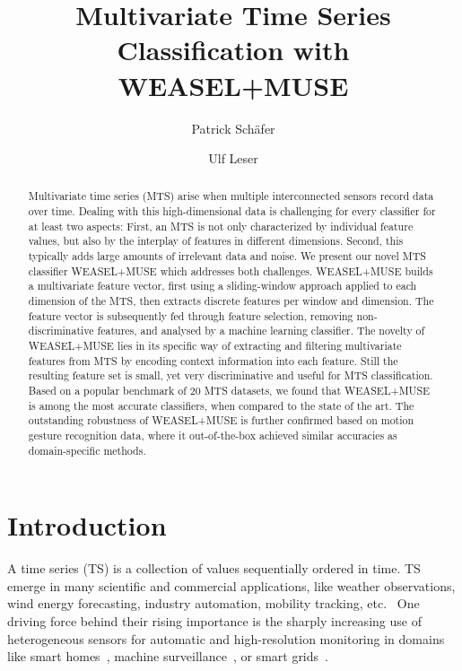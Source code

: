 \documentclass[sigconf]{acmart}
\begin{document}
\title{Multivariate Time Series Classification with WEASEL+MUSE}

\author{Patrick Sch\"afer}

\author{Ulf Leser}

\begin{abstract}
Multivariate time series (MTS) arise when multiple interconnected sensors record data over time. 
Dealing with this high-dimensional data is challenging for every classifier for at least two aspects: First, an MTS is not only characterized by individual feature values, but also by the interplay of features in different dimensions. Second, this typically adds large amounts of irrelevant data and noise.
We present our novel MTS classifier WEASEL+MUSE which addresses both challenges. WEASEL+MUSE builds a multivariate feature vector, first using a sliding-window approach applied to each dimension of the MTS, then extracts discrete features per window and dimension. The feature vector is subsequently fed through feature selection, removing non-discriminative features, and analysed by a machine learning classifier. The novelty of WEASEL+MUSE lies in its specific way of extracting and filtering multivariate features from MTS by encoding context information into each feature. Still the resulting feature set is small, yet very discriminative and useful for MTS classification.
Based on a popular benchmark of $20$ MTS datasets, we found that WEASEL+MUSE is among the most accurate classifiers, when compared to the state of the art. The outstanding robustness of WEASEL+MUSE is further confirmed based on motion gesture recognition data, where it out-of-the-box achieved similar accuracies as domain-specific methods.
\end{abstract}

\maketitle
\sloppy

\section{Introduction}
A time series (TS) is a collection of values sequentially ordered in time. TS emerge in many scientific and commercial applications, like weather observations, wind energy forecasting, industry automation, mobility tracking, etc.~\cite{UCRClassification} One driving force behind their rising importance is the sharply increasing use of heterogeneous sensors for automatic and high-resolution monitoring in domains like smart homes~\cite{jerzak2014debs}, machine surveillance~\cite{mutschler2013debs}, or smart grids~\cite{WindPower,hobbs1999analysis}. 
\end{document}
